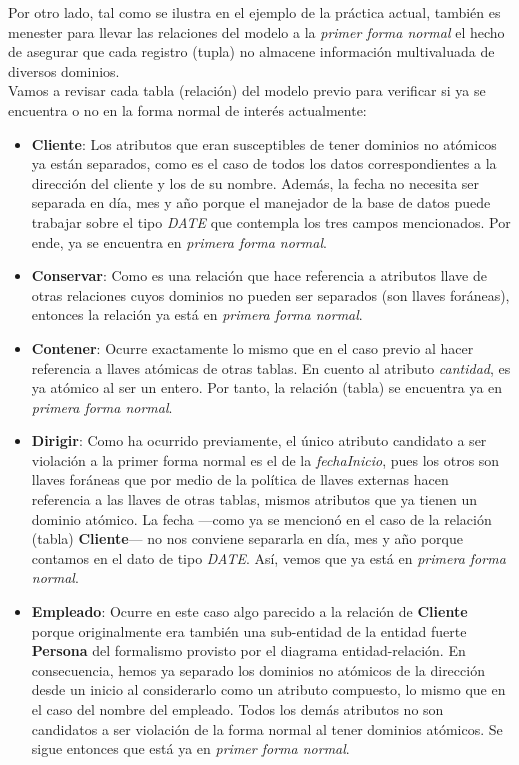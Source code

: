 \documentclass[11pt,letterpaper]{article}
\begin{document}
Por otro lado, tal como se ilustra en el ejemplo de la práctica actual, también es menester para llevar las relaciones del modelo a la \textit{primer forma normal} el hecho de asegurar que cada registro (tupla) no almacene información multivaluada de diversos dominios.\\

Vamos a revisar cada tabla (relación) del modelo previo para verificar si ya se encuentra o no en la forma normal de interés actualmente:

\begin{itemize}
\item \textbf{Cliente}: Los atributos que eran susceptibles de tener dominios no atómicos ya están separados, como es el caso de todos los datos correspondientes a la dirección del cliente y los de su nombre. Además, la fecha no necesita ser separada en día, mes y año porque el manejador de la base de datos puede trabajar sobre el tipo \textit{DATE} que contempla los tres campos mencionados. Por ende, ya se encuentra en \textit{primera forma normal}.
\item \textbf{Conservar}: Como es una relación que hace referencia a atributos llave de otras relaciones cuyos dominios no pueden ser separados (son llaves foráneas), entonces la relación ya está en \textit{primera forma normal}.
\item \textbf{Contener}: Ocurre exactamente lo mismo que en el caso previo al hacer referencia a llaves atómicas de otras tablas. En cuento al atributo \textit{cantidad}, es ya atómico al ser un entero. Por tanto, la relación (tabla) se encuentra ya en \textit{primera forma normal}.
\item \textbf{Dirigir}: Como ha ocurrido previamente, el único atributo candidato a ser violación a la primer forma normal es el de la \textit{fechaInicio}, pues los otros son llaves foráneas que por medio de la política de llaves externas hacen referencia a las llaves de otras tablas, mismos atributos que ya tienen un dominio atómico. La fecha ---como ya se mencionó en el caso de la relación (tabla) \textbf{Cliente}--- no nos conviene separarla en día, mes y año porque contamos en el dato de tipo \textit{DATE}. Así, vemos que ya está en \textit{primera forma normal}.
\item \textbf{Empleado}: Ocurre en este caso algo parecido a la relación de \textbf{Cliente} porque originalmente era también una sub-entidad de la entidad fuerte \textbf{Persona} del formalismo provisto por el diagrama entidad-relación. En consecuencia, hemos ya separado los dominios no atómicos de la dirección desde un inicio al considerarlo como un atributo compuesto, lo mismo que en el caso del nombre del empleado. Todos los demás atributos no son candidatos a ser violación de la forma normal al tener dominios atómicos. Se sigue entonces que está ya en \textit{primer forma normal}.


\end{itemize}
\end{document}
